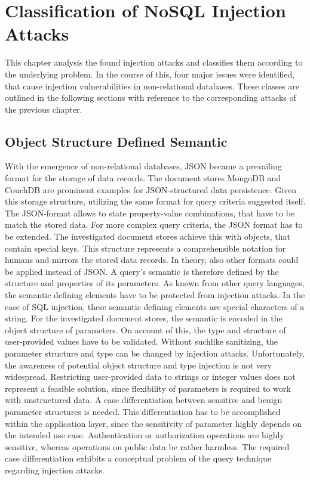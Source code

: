 \chapter{Classification of NoSQL Injection Attacks}
\label{cha:classification}
This chapter analysis the found injection attacks and classifies them according to the underlying problem. In the course of this, four major issues were identified, that cause injection vulnerabilities in non-relational databases. These classes are outlined in the following sections with reference to the corresponding attacks of the previous chapter.

\section{Object Structure Defined Semantic}
With the emergence of non-relational databases, JSON became a prevailing format for the storage of data records. The document stores MongoDB and CouchDB are prominent examples for JSON-structured data persistence. Given this storage structure, utilizing the same format for query criteria suggested itself. The JSON-format allows to state property-value combinations, that have to be match the stored data. For more complex query criteria, the JSON format has to be extended. The investigated document stores achieve this with objects, that contain special keys. This structure represents a comprehensible notation for humans and mirrors the stored data records. In theory, also other formats could be applied instead of JSON. A query's semantic is therefore defined by the structure and properties of its parameters. As known from other query languages, the semantic defining elements have to be protected from injection attacks. In the case of SQL injection, these semantic defining elements are special characters of a string. For the investigated document stores, the semantic is encoded in the object structure of parameters. On account of this, the type and structure of user-provided values have to be validated. Without suchlike sanitizing, the parameter structure and type can be changed by injection attacks. Unfortunately, the awareness of potential object structure and type injection is not very widespread. Restricting user-provided data to strings or integer values does not represent a feasible solution, since flexibility of parameters is required to work with unstructured data. A case differentiation between sensitive and benign parameter structures is needed. This differentiation has to be accomplished within the application layer, since the sensitivity of parameter highly depends on the intended use case. Authentication or authorization operations are highly sensitive, whereas operations on public data be rather harmless. The required case differentiation exhibits a conceptual problem of the query technique regarding injection attacks.\\

